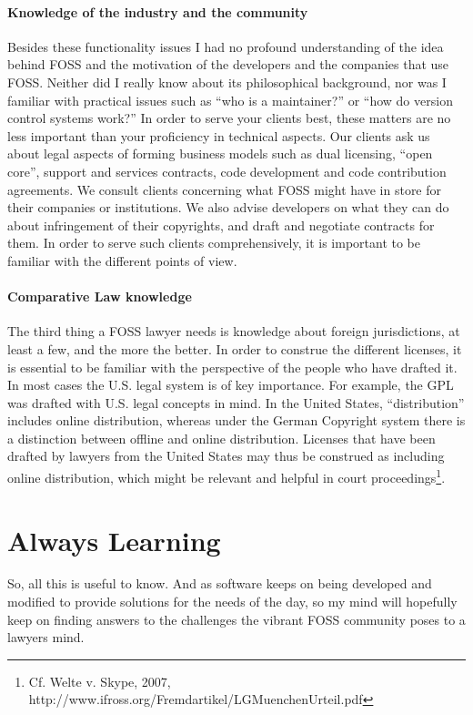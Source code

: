 \paragraph*{Knowledge of the industry and the community}
Besides these functionality issues I had no profound understanding of the idea behind FOSS and the motivation of the developers and the companies that use FOSS. Neither did I really know about its philosophical background, nor was I familiar with practical issues such as “who is a maintainer?” or “how do version control systems work?” In order to serve your clients best, these matters are no less important than your proficiency in technical aspects.  
Our clients ask us about legal aspects of forming business models such as dual licensing, “open core”, support and services contracts, code development and code contribution agreements. We consult clients concerning what FOSS might have in store for their companies or institutions. We also advise developers on what they can do about infringement of their copyrights, and draft and negotiate contracts for them. In order to serve such clients comprehensively, it is important to be familiar with the different points of view.  

\paragraph*{Comparative Law knowledge}
The third thing a FOSS lawyer needs is knowledge about foreign jurisdictions, at least a few, and the more the better. In order to construe the different licenses, it is essential to be familiar with the perspective of the people who have drafted it. In most cases the U.S. legal system is of key importance. For example, the GPL was drafted with U.S. legal concepts in mind. In the United States, “distribution” includes online distribution, whereas under the German Copyright system there is a distinction between offline and online distribution. Licenses that have been drafted by lawyers from the United States may thus be construed as including online distribution, which might be relevant and helpful in court proceedings\footnote{Cf. Welte v. Skype, 2007,  http://www.ifross.org/Fremdartikel/LGMuenchenUrteil.pdf}.
 
\section*{Always Learning}
So, all this is useful to know. And as software keeps on being developed and modified to provide solutions for the needs of the day, so my mind will hopefully keep on finding answers to the challenges the vibrant FOSS community poses to a lawyers mind.